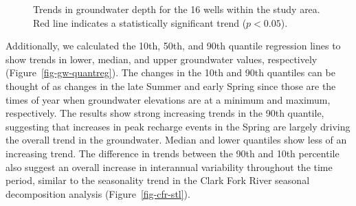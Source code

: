 \documentclass[
  letterpaper,
  DIV=11,
  numbers=noendperiod]{scrartcl}
\begin{document}
\begin{figure}


\caption{\label{fig-gw-trends}Trends in groundwater depth for the 16
wells within the study area. Red line indicates a statistically
significant trend (\(p<0.05\)).}

\end{figure}%

Additionally, we calculated the 10th, 50th, and 90th quantile regression
lines to show trends in lower, median, and upper groundwater values,
respectively (Figure~\ref{fig-gw-quantreg}). The changes in the 10th and
90th quantiles can be thought of as changes in the late Summer and early
Spring since those are the times of year when groundwater elevations are
at a minimum and maximum, respectively. The results show strong
increasing trends in the 90th quantile, suggesting that increases in
peak recharge events in the Spring are largely driving the overall trend
in the groundwater. Median and lower quantiles show less of an
increasing trend. The difference in trends between the 90th and 10th
percentile also suggest an overall increase in interannual variability
throughout the time period, similar to the seasonality trend in the
Clark Fork River seasonal decomposition analysis
(Figure~\ref{fig-cfr-stl}).
\end{document}
